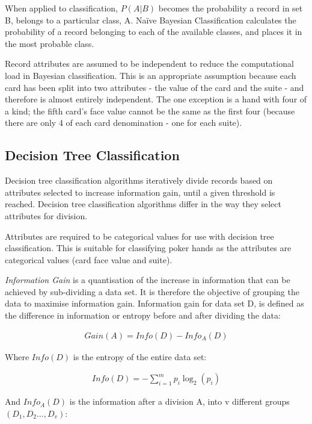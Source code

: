 \documentclass[11pt, a4paper]{article}
\begin{document}
When applied to classification, $P(A|B)$ becomes the probability a record in set B, belongs to a particular class, A. Na\"ive Bayesian Classification calculates the probability of a record belonging to each of the available classes, and places it in the most probable class.	

Record attributes are assumed to be independent to reduce the computational load in Bayesian classification. This is an appropriate assumption because each card has been split into two attributes - the value of the card and the suite - and therefore is almost entirely independent. The one exception is a hand with four of a kind; the fifth card's face value cannot be the same as the first four (because there are only 4 of each card denomination - one for each suite).

\subsection*{Decision Tree Classification}

Decision tree classification algorithms iteratively divide records based on attributes selected to increase information gain, until a given threshold is reached. Decision tree classification algorithms differ in the way they select attributes for division.

Attributes are required to be categorical values for use with decision tree classification. This is suitable for classifying poker hands as the attributes are categorical values (card face value and suite).

\textit{Information Gain} is a quantisation of the increase in information that can be achieved by sub-dividing a data set. It is therefore the objective of grouping the data to maximise information gain. Information gain for data set D, is defined as the difference in information or entropy before and after dividing the data:

\begin{align*}
	Gain(A) = Info(D) - Info_A(D)
\end{align*}

Where $Info(D)$ is the entropy of the entire data set:

\begin{align*}
	Info(D) = - \sum^{m}_{i=1}p_i\log_2(p_i)
\end{align*}

And $Info_A(D)$ is the information after a division A, into v different groups $(D_1,  D_2 \ldots, D_v)$:
\end{document}
